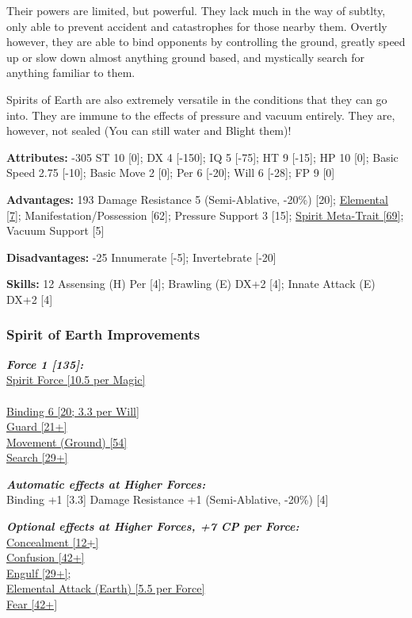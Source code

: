 \begin{multicols*}{3}
	Their powers are limited, but powerful. They lack much in the way of subtlty, only able to prevent accident and catastrophes for those nearby them. Overtly however, they are able to bind opponents by controlling the ground, greatly speed up or slow down almost anything ground based, and mystically search for anything familiar to them.
	
	Spirits of Earth are also extremely versatile in the conditions that they can go into. They are immune to the effects of pressure and vacuum entirely. They are, however, not sealed (You can still water and Blight them)!
	
	\textbf{Attributes:} -305
	ST 10 [0]; DX 4 [-150]; IQ 5 [-75]; HT 9 [-15]; HP 10 [0]; Basic Speed 2.75 [-10]; Basic Move 2 [0]; Per 6 [-20]; Will 6 [-28]; FP 9 [0]
	
	\textbf{Advantages:} 193
	Damage Resistance 5 (Semi-Ablative, -20\%) [20]; \hyperref[elemental]{Elemental [7]}; Manifestation/Possession [62]; Pressure Support 3 [15]; \hyperref[spirit_meta_trait]{Spirit Meta-Trait [69]}; Vacuum Support [5]
	
	\textbf{Disadvantages:} -25
	Innumerate [-5]; Invertebrate [-20]
	
	\textbf{Skills:} 12
	Assensing (H) Per [4]; Brawling (E) DX+2 [4]; Innate Attack (E) DX+2 [4]
	
	\subsubsection*{Spirit of Earth Improvements}
	
	\textbf{\textit{Force 1 [135]:\\}}
	\hyperref[spirit_force]{Spirit Force [10.5 per Magic]}\\\\
	\hyperref[binding]{Binding 6 [20; 3.3 per Will]}\\
	\hyperref[guard]{Guard [21+]}\\
	\hyperref[movement]{Movement (Ground) [54]}\\
	\hyperref[search]{Search [29+]}
	
	\textbf{\textit{Automatic effects at Higher Forces:\\}}
	Binding +1 [3.3]
	Damage Resistance +1 (Semi-Ablative, -20\%) [4]
	
	\textbf{\textit{Optional effects at Higher Forces, +7 CP per Force:\\}}
	\hyperref[concealment]{Concealment [12+]}\\
	\hyperref[confusion]{Confusion [42+]}\\
	\hyperref[engulf]{Engulf [29+];}\\
	\hyperref[elemental_attack]{Elemental Attack (Earth) [5.5 per Force]}\\
	\hyperref[fear]{Fear [42+]}\\
	

\end{multicols*}
